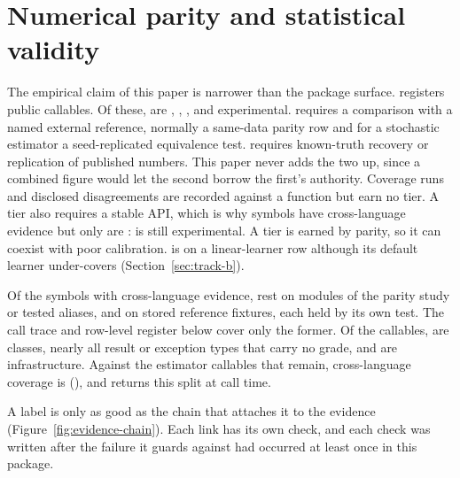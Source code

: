 \section{Numerical parity and statistical validity}\label{sec:parity}

The empirical claim of this paper is narrower than the package surface.
\statspai{} registers \RegistryTotal{} public callables. Of these,
\RegistryCertified{} are , \RegistryValidated{}
, \RegistryApiStable{} , and
\RegistryExperimental{} experimental.  requires a
comparison with a named external reference, normally a same-data parity
row and for a stochastic estimator a seed-replicated equivalence test.
 requires known-truth recovery or replication of published
numbers. This paper never adds the two up, since a combined figure would
let the second borrow the first's authority. Coverage runs and disclosed
disagreements are recorded against a function but earn no tier. A tier
also requires a stable API, which is why \ParityCrossLanguage{} symbols
have cross-language evidence but only \RegistryCertified{} are
: \ParityCrossNotCertifiedNames{} is still experimental.
A tier is earned by parity, so it can coexist with poor calibration.
 is  on a linear-learner row although its
default learner under-covers (Section~\ref{sec:track-b}).

Of the \ParityCrossLanguage{} symbols with cross-language evidence,
\ParityTrackACrossCount{} rest on modules of the parity study or tested
aliases, and \ParityFrozenCrossCount{} on stored reference fixtures, each
held by its own test. The call trace and row-level register below cover
only the former. Of the \RegistryTotal{} callables, \ParityClassTotal{} are
classes, nearly all result or exception types that carry no grade, and
\ParityInfraTotal{} are infrastructure. Against the
\ParityEstimatorTotal{} estimator callables that remain, cross-language
coverage is \ParityEstimatorCrossLanguage{}
(\ParityEstimatorCrossLanguagePct{}), and 
returns this split at call time.

A label is only as good as the chain that attaches it to the evidence
(Figure~\ref{fig:evidence-chain}). Each link has its own check, and each
check was written after the failure it guards against had occurred at
least once in this package.

